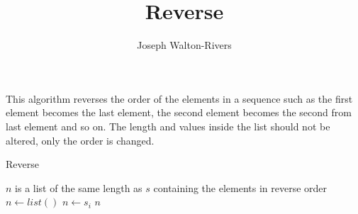 \documentclass{../fal_assignment}
\title{Reverse}
\author{Joseph Walton-Rivers}
\begin{document}
\maketitle

This algorithm reverses the order of the elements in a sequence such as the first element becomes the last element, the second element becomes the second from last element and so on. The length and values inside the list should not be altered, only the order is changed.

\begin{algorithm}[ht]
	\caption{Reverse}
	\label{alg:algorithm}
	
	\begin{algorithmic}[1]
		\Ensure
		\Statex  $n$ is a list of the same length as $s$ containing the elements in reverse order
		\State $n\gets list()$
		\State $n \gets s_i$
		\EndFor
		\State \Return $n$
		\EndFunction
	\end{algorithmic}
\end{algorithm}
\end{document}
